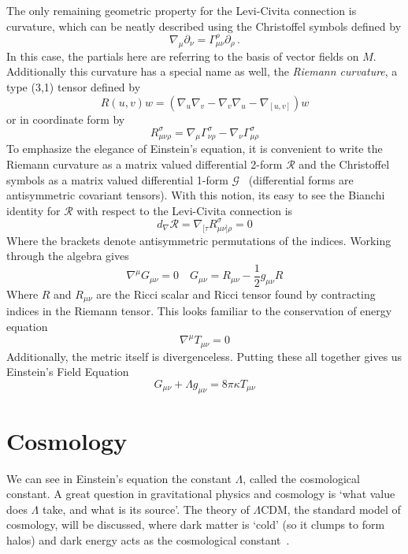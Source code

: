The only remaining geometric property for the Levi-Civita connection is curvature, which can be neatly described using the Christoffel symbols defined by
\begin{equation}
    \nabla_\mu\partial_\nu = \Gamma^{\rho}_{\mu\nu}\partial_\rho\,.
\end{equation}
In this case, the partials here are referring to the basis of vector fields on $M$. Additionally this curvature has a special name as well, the \textit{Riemann curvature}, a type (3,1) tensor defined by
\begin{equation}
    R(u,v)w = (\nabla_u\nabla_v-\nabla_v\nabla_u - \nabla_{[u,v]})w
\end{equation}
or in coordinate form by
\begin{equation}
    R_{\mu\nu\rho}^\sigma  = \nabla_\mu \Gamma^\sigma_{\nu\rho} - \nabla_\nu\Gamma^{\sigma}_{\mu\rho}
\end{equation}
To emphasize the elegance of Einstein's equation, it is convenient to write the Riemann curvature as a matrix valued differential 2-form $\mathcal{R}$ and the Christoffel symbols as a matrix valued differential 1-form $\mathcal{G}$~\cite{baez_john_gauge_1994} (differential forms are antisymmetric covariant tensors). With this notion, its easy to see the Bianchi identity for $\mathcal{R}$ with respect to the Levi-Civita connection is
\begin{equation}
    d_{\nabla}\mathcal{R} = \nabla_{[\tau}R^\sigma_{\mu\nu]\rho} = 0
\end{equation}
Where the brackets denote antisymmetric permutations of the indices. Working through the algebra gives
\begin{equation}
    \nabla^\mu G_{\mu\nu} = 0\quad G_{\mu\nu} = R_{\mu\nu}-\frac{1}{2}g_{\mu\nu}R
\end{equation}
Where $R$ and $R_{\mu\nu}$ are the Ricci scalar and Ricci tensor found by contracting indices in the Riemann tensor. This looks familiar to the conservation of energy equation
\begin{equation}
    \nabla^\mu T_{\mu\nu}=0
\end{equation}
Additionally, the metric itself is divergenceless. Putting these all together gives us Einstein's Field Equation
\begin{equation}
    G_{\mu\nu} + \Lambda g_{\mu\nu} = 8\pi\kappa T_{\mu\nu}
\end{equation}

\section{Cosmology}
We can see in Einstein's equation the constant $\Lambda$, called the cosmological constant. A great question in gravitational physics and cosmology is `what value does $\Lambda$ take, and what is its source'. The theory of $\Lambda$CDM, the standard model of cosmology, will be discussed, where dark matter is `cold' (so it clumps to form halos) and dark energy acts as the cosmological constant~\cite{scott_dodelson_modern_2021}.


